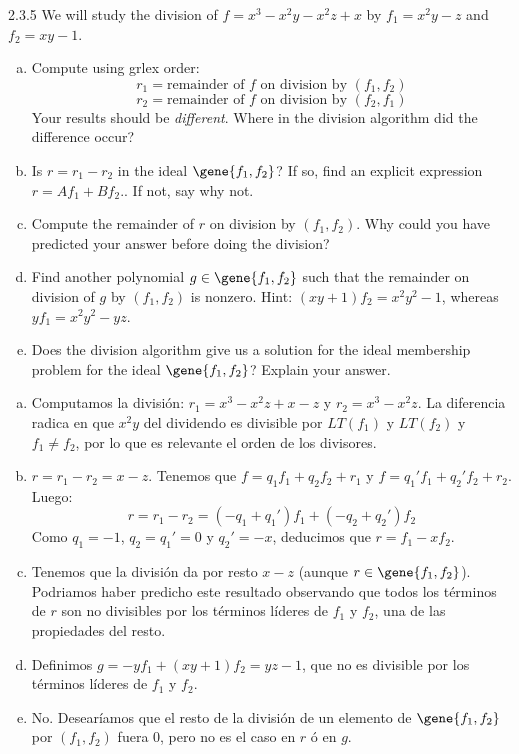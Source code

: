 \documentclass[twoside]{article}
\begin{document}
\begin{ejercicio}{2.3.5}
We will study the division of $f = x^3-x^2y-x^2z+x$ by $f_1 = x^2y-z$ and $f_2 = xy-1$.
\begin{enumerate}[a.]
\item Compute using grlex order:
\[ r_1 = \text{remainder of $f$ on division by $(f_1,f_2)$} \]
\[ r_2 = \text{remainder of $f$ on division by $(f_2,f_1)$} \]
Your results should be \emph{different}.
Where in the division algorithm did the difference occur?
\item Is $r = r_1-r_2$ in the ideal $\gene{f_1,f_2}$?
If so, find an explicit expression $r = Af_1 + Bf_2$..
If not, say why not.
\item Compute the remainder of $r$ on division by $(f_1,f_2)$.
Why could you have predicted your answer before doing the division?
\item Find another polynomial $g \in \gene{f_1,f_2}$ such that the remainder on division of $g$ by $(f_1,f_2)$ is nonzero.
Hint: $(xy+1)f_2 = x^2y^2-1$, whereas $yf_1 = x^2y^2-yz$.
\item Does the division algorithm give us a solution for the ideal membership problem for the ideal $\gene{f_1,f_2}$?
Explain your answer.
\end{enumerate}
\end{ejercicio}
\begin{solucion}
\begin{enumerate}[a.]
\item Computamos la división: $r_1 = x^3-x^2z+x-z$ y $r_2 = x^3-x^2z$. 
La diferencia radica en que $x^2y$ del dividendo es divisible por $LT(f_1)$ y $LT(f_2)$ y $f_1 \neq f_2$, por lo que es relevante el orden de los divisores.
\item $r=r_1-r_2 = x-z$. Tenemos que $f = q_1f_1+q_2f_2 + r_1$ y $f = q_1'f_1+q_2'f_2 + r_2$. Luego:
\[ r=r_1-r_2 = (-q_1+q_1')f_1+(-q_2+q_2')f_2 \]
Como $q_1 = -1$, $q_2 = q_1' = 0$ y $q_2' = -x$, deducimos que $r = f_1 - x f_2$.
\item Tenemos que la división da por resto $x-z$ (aunque $r \in \gene{f_1,f_2}$).
Podriamos haber predicho este resultado observando que todos los términos de $r$ son no divisibles por los términos líderes de $f_1$ y $f_2$, una de las propiedades del resto.
\item Definimos $g = -yf_1 + (xy+1)f_2 = yz-1$, que no es divisible por los términos líderes de $f_1$ y $f_2$.
\item No. Desearíamos que el resto de la división de un elemento de $\gene{f_1,f_2}$ por $(f_1,f_2)$ fuera $0$, pero no es el caso en $r$ ó en $g$.
\end{enumerate}
\end{solucion}
\end{document}
